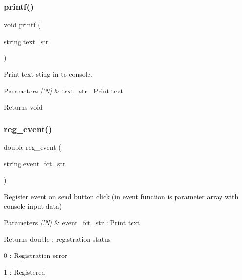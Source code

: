\subsubsection{printf()}
{\footnotesize\ttfamily void printf (\begin{DoxyParamCaption}\item[{string}]{text\+\_\+str }\end{DoxyParamCaption})}



Print text sting in to console. 


\begin{DoxyCode}{0}
\end{DoxyCode}



\begin{DoxyParams}{Parameters}
{\em \mbox{[}\+I\+N\mbox{]}} & text\+\_\+str \+: Print text \\
\hline
\end{DoxyParams}
\begin{DoxyReturn}{Returns}
void 
\end{DoxyReturn}
\mbox{\label{classmain__frame_a5de0221752900adfbd902ddbe445eee4}} 
\subsubsection{reg\_event()}
{\footnotesize\ttfamily double reg\+\_\+event (\begin{DoxyParamCaption}\item[{string}]{event\+\_\+fct\+\_\+str }\end{DoxyParamCaption})}



Register event on send button click (in event function is parameter array with console input data) 


\begin{DoxyCode}{0}
\DoxyCodeLine{\{}
\DoxyCodeLine{\}}
\end{DoxyCode}



\begin{DoxyParams}{Parameters}
{\em \mbox{[}\+I\+N\mbox{]}} & event\+\_\+fct\+\_\+str \+: Print text \\
\hline
\end{DoxyParams}
\begin{DoxyReturn}{Returns}
double \+: registration status \begin{DoxyItemize}
\item 0 \+: Registration error \item 1 \+: Registered \end{DoxyItemize}

\end{DoxyReturn}
\mbox{\label{classmain__frame_acfdcad0ad326ba921b048b0be0b4299e}} 
